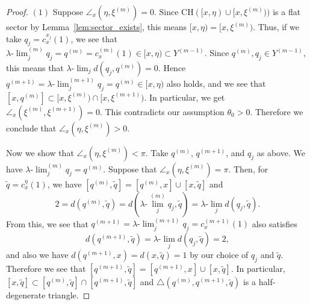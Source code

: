 \documentclass[12pt]{amsart}
\numberwithin{equation}{section}
\theoremstyle{plain}
\theoremstyle{definition}
\theoremstyle{remark}
\newcommand{\uulim}[1][]{\lambda{\text{-}}\!{\lim}^{(#1)}}
\newcommand{\ulim}{\lambda{\text{-}}\!\lim}
\newcommand{\q}[1]{q^{(#1)}}
\newcommand{\xxi}[1]{\xi^{(#1)}}
\newcommand{\ray}[1]{[#1)}
\newcommand{\cc}[2]{c_{#1}^{#2}}
\newcommand{\tri}[3]{\triangle(#1,#2,#3)}
\newcommand{\ch}[1]{\mathrm{CH}(#1)}
\newcommand{\zure}{\theta_0}
\begin{document}
\begin{proof}
$(1)$ Suppose $\angle_{x}(\eta,\xxi{m})=0$. 
 Since $\ch{\ray{x,\eta}\cup \ray{x,\xxi{m}}}$ is a flat sector by
 Lemma~\ref{lem:sector_exists}, this means
 $\ray{x,\eta}=\ray{x,\xxi{m}}$. 
 Thus, if we take $q_j=\cc{x}{x_j}(1)$,  we see that 
 $\uulim[m]_j q_j= \q{m}=\cc{x}{(m)}(1) \in\ray{x,\eta}\subset Y^{(m-1)}$. 
 Since $\q{m}, q_j \in Y^{(m-1)}$, this means that 
 $\ulim_j d(q_j,\q{m})=0$. 
 Hence $\q{m+1}=\uulim[m+1]_jq_j = \q{m} \in \ray{x,\eta}$ also holds,
 and we see that 
 $[x,\q{m}] \subset \ray{x,\xxi{m}}\cap \ray{x,\xxi{m+1}}$. 
 In particular, we get $\angle_{x}(\xxi{m},\xxi{m+1})=0$. 
 This contradicts our assumption $\zure>0$. 
 Therefore we conclude that $\angle_{x}(\eta,\xxi{m})>0$. 

 Now we show that $\angle_{x}(\eta,\xxi{m})<\pi$. 
 Take $\q{m}$, $\q{m+1}$, and $q_j$ as above. 
 We have $\uulim[m]_j q_j=\q{m}$. 
 Suppose that $\angle_{x}(\eta,\xxi{m})=\pi$. 
 Then, for $\tilde q=\cc{x}{\eta}(1)$, we have
 $[\q{m},\tilde q]=[\q{m},x]\cup [x,\tilde q]$ and 
\begin{equation*}
 2=d(\q{m},\tilde q)=d(\uulim[m]_j q_j, \tilde q)=
 \ulim_j d(q_j,\tilde q). 
\end{equation*}
 From this, we see that $\q{m+1}=\uulim[m+1]_j q_j=\cc{x}{(m+1)}(1)$
 also satisfies
\begin{equation*}
 d(\q{m+1},\tilde q)=\ulim_j d(q_j,\tilde q) =2, 
\end{equation*}
 and also we have $d(\q{m+1},x)=d(x,\tilde q)=1$ by our choice of $q_j$
 and $\tilde q$. 
 Therefore we see that 
 $[\q{m+1},\tilde q]=[\q{m+1},x]\cup [x,\tilde q]$. 
 In particular, 
 $[x,\tilde q] \subset [\q{m},\tilde q]\cap [\q{m+1},\tilde q]$
 and $\tri{\q{m}}{\q{m+1}}{\tilde q}$ is a half-degenerate triangle. 
 

\end{proof}
\end{document}
